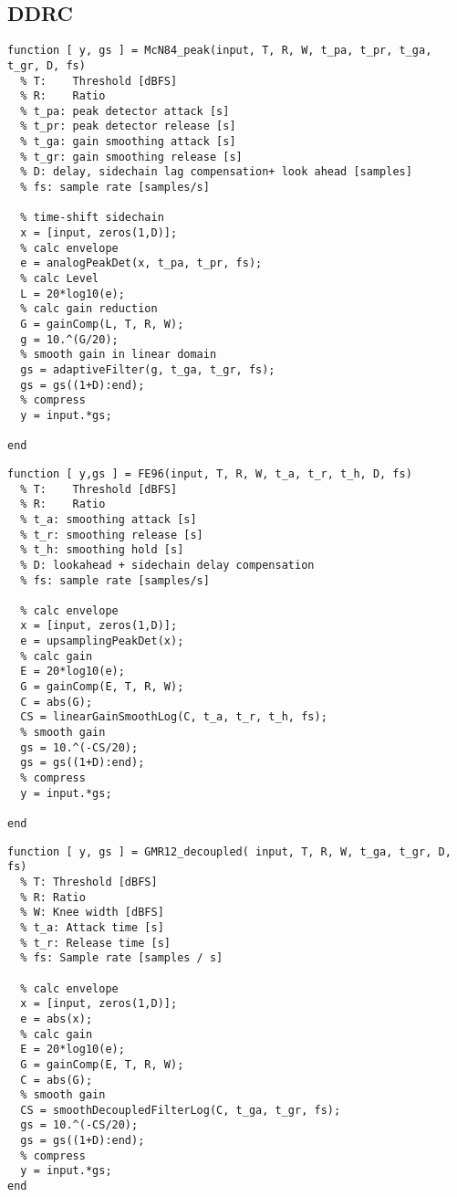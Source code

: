 \documentclass[../main2.tex]{subfiles}
\begin{document}
\clearpage
\subsection{DDRC}
\begin{lstlisting}[style=customc]
function [ y, gs ] = McN84_peak(input, T, R, W, t_pa, t_pr, t_ga, t_gr, D, fs)
  % T:    Threshold [dBFS]
  % R:    Ratio
  % t_pa: peak detector attack [s]
  % t_pr: peak detector release [s]
  % t_ga: gain smoothing attack [s]
  % t_gr: gain smoothing release [s]
  % D: delay, sidechain lag compensation+ look ahead [samples]
  % fs: sample rate [samples/s]

  % time-shift sidechain
  x = [input, zeros(1,D)];
  % calc envelope
  e = analogPeakDet(x, t_pa, t_pr, fs);
  % calc Level
  L = 20*log10(e);
  % calc gain reduction
  G = gainComp(L, T, R, W);
  g = 10.^(G/20);
  % smooth gain in linear domain
  gs = adaptiveFilter(g, t_ga, t_gr, fs);
  gs = gs((1+D):end);
  % compress
  y = input.*gs;
    
end
\end{lstlisting}


\begin{lstlisting}[style=customc]
function [ y,gs ] = FE96(input, T, R, W, t_a, t_r, t_h, D, fs)
  % T:    Threshold [dBFS]
  % R:    Ratio
  % t_a: smoothing attack [s]
  % t_r: smoothing release [s]
  % t_h: smoothing hold [s]
  % D: lookahead + sidechain delay compensation
  % fs: sample rate [samples/s]
  
  % calc envelope
  x = [input, zeros(1,D)];
  e = upsamplingPeakDet(x);
  % calc gain
  E = 20*log10(e);
  G = gainComp(E, T, R, W);
  C = abs(G);
  CS = linearGainSmoothLog(C, t_a, t_r, t_h, fs);
  % smooth gain
  gs = 10.^(-CS/20);
  gs = gs((1+D):end);
  % compress
  y = input.*gs;

end
\end{lstlisting}


\begin{lstlisting}[style=customc]
function [ y, gs ] = GMR12_decoupled( input, T, R, W, t_ga, t_gr, D, fs)
  % T: Threshold [dBFS]
  % R: Ratio
  % W: Knee width [dBFS]
  % t_a: Attack time [s]
  % t_r: Release time [s]
  % fs: Sample rate [samples / s]
  
  % calc envelope
  x = [input, zeros(1,D)];
  e = abs(x);
  % calc gain
  E = 20*log10(e);
  G = gainComp(E, T, R, W);
  C = abs(G);
  % smooth gain
  CS = smoothDecoupledFilterLog(C, t_ga, t_gr, fs);
  gs = 10.^(-CS/20);
  gs = gs((1+D):end);
  % compress
  y = input.*gs;
end
\end{lstlisting}
\end{document}
